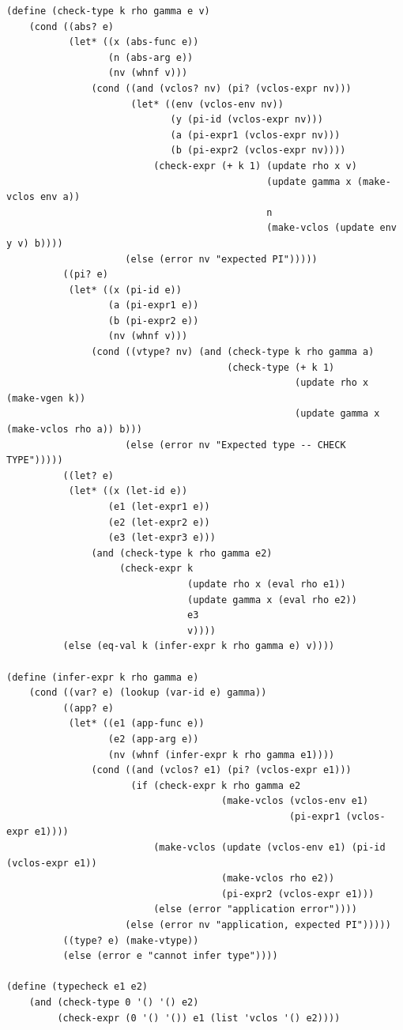 \documentclass{article}
\begin{document}
\begin{verbatim}
(define (check-type k rho gamma e v)
    (cond ((abs? e)
           (let* ((x (abs-func e))
                  (n (abs-arg e))
                  (nv (whnf v)))
               (cond ((and (vclos? nv) (pi? (vclos-expr nv)))
                      (let* ((env (vclos-env nv))
                             (y (pi-id (vclos-expr nv)))
                             (a (pi-expr1 (vclos-expr nv)))
                             (b (pi-expr2 (vclos-expr nv))))
                          (check-expr (+ k 1) (update rho x v)
                                              (update gamma x (make-vclos env a))
                                              n
                                              (make-vclos (update env y v) b))))
                     (else (error nv "expected PI")))))
          ((pi? e)
           (let* ((x (pi-id e))
                  (a (pi-expr1 e))
                  (b (pi-expr2 e))
                  (nv (whnf v)))
               (cond ((vtype? nv) (and (check-type k rho gamma a)
                                       (check-type (+ k 1)
                                                   (update rho x (make-vgen k))
                                                   (update gamma x (make-vclos rho a)) b)))
                     (else (error nv "Expected type -- CHECK TYPE")))))
          ((let? e)
           (let* ((x (let-id e))
                  (e1 (let-expr1 e))
                  (e2 (let-expr2 e))
                  (e3 (let-expr3 e)))
               (and (check-type k rho gamma e2)
                    (check-expr k
                                (update rho x (eval rho e1))
                                (update gamma x (eval rho e2))
                                e3
                                v))))
          (else (eq-val k (infer-expr k rho gamma e) v))))

(define (infer-expr k rho gamma e)
    (cond ((var? e) (lookup (var-id e) gamma))
          ((app? e)
           (let* ((e1 (app-func e))
                  (e2 (app-arg e))
                  (nv (whnf (infer-expr k rho gamma e1))))
               (cond ((and (vclos? e1) (pi? (vclos-expr e1)))
                      (if (check-expr k rho gamma e2
                                      (make-vclos (vclos-env e1)
                                                  (pi-expr1 (vclos-expr e1))))
                          (make-vclos (update (vclos-env e1) (pi-id (vclos-expr e1))
                                      (make-vclos rho e2))
                                      (pi-expr2 (vclos-expr e1)))
                          (else (error "application error"))))
                     (else (error nv "application, expected PI")))))
          ((type? e) (make-vtype))
          (else (error e "cannot infer type"))))

(define (typecheck e1 e2)
    (and (check-type 0 '() '() e2)
         (check-expr (0 '() '()) e1 (list 'vclos '() e2))))
\end{verbatim}
\end{document}
